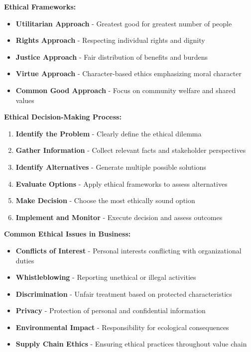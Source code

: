 \documentclass[12pt]{article}
\begin{document}
\textbf{Ethical Frameworks:}
\begin{itemize}
    \item \textbf{Utilitarian Approach} - Greatest good for greatest number of people
    \item \textbf{Rights Approach} - Respecting individual rights and dignity
    \item \textbf{Justice Approach} - Fair distribution of benefits and burdens
    \item \textbf{Virtue Approach} - Character-based ethics emphasizing moral character
    \item \textbf{Common Good Approach} - Focus on community welfare and shared values
\end{itemize}

\textbf{Ethical Decision-Making Process:}
\begin{enumerate}
    \item \textbf{Identify the Problem} - Clearly define the ethical dilemma
    \item \textbf{Gather Information} - Collect relevant facts and stakeholder perspectives
    \item \textbf{Identify Alternatives} - Generate multiple possible solutions
    \item \textbf{Evaluate Options} - Apply ethical frameworks to assess alternatives
    \item \textbf{Make Decision} - Choose the most ethically sound option
    \item \textbf{Implement and Monitor} - Execute decision and assess outcomes
\end{enumerate}

\textbf{Common Ethical Issues in Business:}
\begin{itemize}
    \item \textbf{Conflicts of Interest} - Personal interests conflicting with organizational duties
    \item \textbf{Whistleblowing} - Reporting unethical or illegal activities
    \item \textbf{Discrimination} - Unfair treatment based on protected characteristics
    \item \textbf{Privacy} - Protection of personal and confidential information
    \item \textbf{Environmental Impact} - Responsibility for ecological consequences
    \item \textbf{Supply Chain Ethics} - Ensuring ethical practices throughout value chain
\end{itemize}
\end{document}
